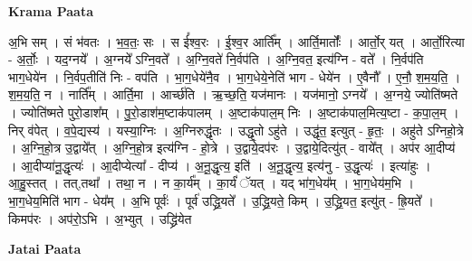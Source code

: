 \documentclass[17pt]{extarticle}
\begin{document}
\textbf{Krama Paata} \newline

अ॒भि सम् । सं भ॑वतः । भ॒व॒तः॒ सः । स ई᳚श्व॒रः । ई॒श्व॒र आर्ति᳚म् । आर्ति॒मार्तोः᳚ । आर्तो॒र् यत् । आर्तो॒रित्या - अ॒र्तोः॒ । यद॒ग्नये᳚ । अ॒ग्नये᳚ ऽग्नि॒वते᳚ । अ॒ग्नि॒वते॑ नि॒र्वप॑ति । अ॒ग्नि॒वत॒ इत्य॑ग्नि - वते᳚ । नि॒र्वप॑ति भाग॒धेये॑न । नि॒र्वप॒तीति॑ निः - वप॑ति । भा॒ग॒धेये॑नै॒व । भा॒ग॒धेये॒नेति॑ भाग - धेये॑न । ए॒वैनौ᳚ । ए॒नौ॒ श॒म॒य॒ति॒ । श॒म॒य॒ति॒ न । नार्ति᳚म् । आर्ति॒मा । आर्च्छ॑ति । ऋ॒च्छ॒ति॒ यज॑मानः । यज॑मानो॒ ऽग्नये᳚ । अ॒ग्नये॒ ज्योति॑ष्मते । ज्योति॑ष्मते पुरो॒डाश᳚म् । पु॒रो॒डाश॑म॒ष्टाक॑पालम् । अ॒ष्टाक॑पाल॒म् निः । अ॒ष्टाक॑पाल॒मित्य॒ष्टा - क॒पा॒ल॒म् । निर् व॑पेत् । व॒पे॒द्यस्य॑ । यस्या॒ग्निः । अ॒ग्निरुद्धृ॑तः । उद्धृ॒तो ऽहु॑ते । उद्धृ॑त॒ इत्युत् - हृ॒तः॒ । अहु॑ते ऽग्निहो॒त्रे । अ॒ग्नि॒हो॒त्र उ॒द्वाये᳚त् । अ॒ग्नि॒हो॒त्र इत्य॑ग्नि - हो॒त्रे । उ॒द्वाये॒दप॑रः । उ॒द्वाये॒दित्यु॑त् - वाये᳚त् । अप॑र आ॒दीप्य॑ । आ॒दीप्या॑नू॒द्धृत्यः॑ । आ॒दीप्येत्या᳚ - दीप्य॑ । अ॒नू॒द्धृत्य॒ इति॑ । अ॒नू॒द्धृत्य॒ इत्य॑नु - उ॒द्धृत्यः॑ । इत्या॑हुः । आ॒हु॒स्तत् । तत्,तथा᳚ । तथा॒ न । न का॒र्य᳚म् । का॒र्यं॑ ॅयत् । यद् भा॑ग॒धेय᳚म् । भा॒ग॒धेय॑म॒भि । भा॒ग॒धेय॒मिति॑ भाग - धेय᳚म् । अ॒भि पूर्वः॑ । पूर्व॑ उद्ध्रि॒यते᳚ । उ॒द्ध्रि॒यते॒ किम् । उ॒द्ध्रि॒यत॒ इत्यु॑त् - ह्रि॒यते᳚ । किमप॑रः । अप॑रो॒ऽभि । अ॒भ्युत् । उद्ध्रि॑येत \newline

\textbf{Jatai Paata} \newline
\end{document}
